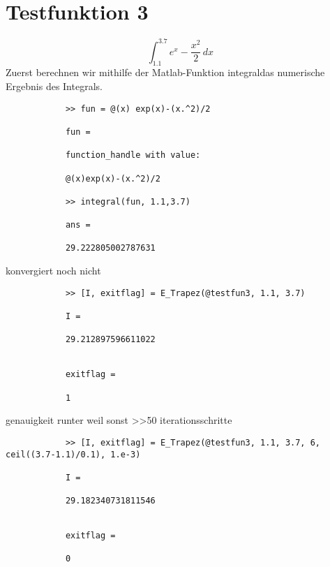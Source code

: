 \documentclass[11pt,titlepage]{article}
\begin{document}
	\section{Testfunktion 3}
		\begin{displaymath}
			\int_{1.1}^{3.7} e^{x} - \dfrac{x^2}{2}  \, dx\
		\end{displaymath}
		Zuerst berechnen wir mithilfe der Matlab-Funktion \glqq integral\grqq  das numerische Ergebnis des Integrals.
		\begin{lstlisting}
			>> fun = @(x) exp(x)-(x.^2)/2
			
			fun =
			
			function_handle with value:
			
			@(x)exp(x)-(x.^2)/2
			
			>> integral(fun, 1.1,3.7)
			
			ans =
			
			29.222805002787631
		\end{lstlisting}
		konvergiert noch nicht
		\begin{lstlisting}
			>> [I, exitflag] = E_Trapez(@testfun3, 1.1, 3.7)
			
			I =
			
			29.212897596611022
			
			
			exitflag =
			
			1
		\end{lstlisting}
		genauigkeit runter weil sonst >>50 iterationsschritte
		\begin{lstlisting}
			>> [I, exitflag] = E_Trapez(@testfun3, 1.1, 3.7, 6, ceil((3.7-1.1)/0.1), 1.e-3)
			
			I =
			
			29.182340731811546
			
			
			exitflag =
			
			0
		\end{lstlisting}
\end{document}
